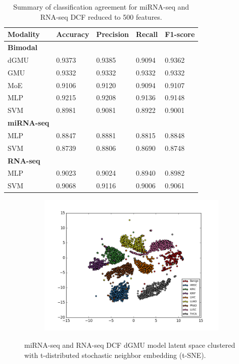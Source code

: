 \begin{table}[H]
   \caption{Summary of classification agreement for miRNA-seq and RNA-seq DCF reduced to 500 features.} 
   \small %
   \centering %
   \begin{tabular}{lllll} %
   \toprule[\heavyrulewidth]\toprule[\heavyrulewidth]
   \textbf{Modality} & \textbf{Accuracy} & \textbf{Precision} & \textbf{Recall} & \textbf{F1-score} \\ 
   \midrule
   \multicolumn{1}{l}{\textbf{Bimodal}} \\
        dGMU & 0.9373 &	0.9385 & 0.9094 & 0.9362\\
        GMU  & 0.9332 &	0.9332 & 0.9332 & 0.9332\\
        MoE  & 0.9106 &	0.9120 & 0.9094 & 0.9107\\
        MLP  & 0.9215 &	0.9208 & 0.9136 & 0.9148\\
        SVM  & 0.8981 &	0.9081 & 0.8922 & 0.9001\\
   \midrule
   \multicolumn{1}{l}{\textbf{miRNA-seq}} \\
        MLP  & 0.8847 &	0.8881 & 0.8815 & 0.8848\\
        SVM  & 0.8739 &	0.8806 & 0.8690 & 0.8748\\
   \midrule
   \multicolumn{1}{l}{\textbf{RNA-seq}}  \\
        MLP  & 0.9023 &	0.9024 & 0.8940 & 0.8982\\
        SVM  & 0.9068 &	0.9116 & 0.9006 & 0.9061\\
   \bottomrule[\heavyrulewidth] 
   \end{tabular}
   \label{table:m_r_dcf_exp41}
\end{table}

\begin{figure}[H]
     \centering
     \begin{subfigure}[b]{\textwidth}
         \centering
         \includegraphics[width=\textwidth]{img/m_r/m_r_dcf_tsne.png}
     \end{subfigure}
        \caption{miRNA-seq and RNA-seq DCF dGMU model latent space clustered with t-distributed stochastic neighbor embedding (t-SNE).}
        \label{fig:r_m_dcf_tsne}
\end{figure}

